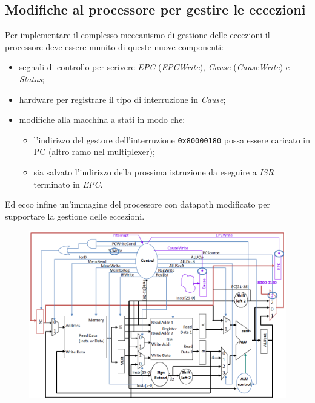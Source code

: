 \documentclass[class=book, crop=false, oneside]{standalone}
\begin{document}
\subsection{Modifiche al processore per gestire le eccezioni}
Per implementare il complesso meccanismo di gestione delle eccezioni il processore deve essere munito di queste nuove componenti:
\begin{itemize}
	\item segnali di controllo per scrivere \emph{EPC} (\emph{EPCWrite}), \emph{Cause} (\emph{CauseWrite}) e \emph{Status};
	\item hardware per registrare il tipo di interruzione in \emph{Cause};
	\item modifiche alla macchina a stati in modo che:
	\begin{itemize}
		\item l'indirizzo del gestore dell'interruzione \texttt{0x80000180} possa essere caricato in PC (altro ramo nel multiplexer);
		\item sia salvato l'indirizzo della prossima istruzione da eseguire a \emph{ISR} terminato in \emph{EPC}.
	\end{itemize}
\end{itemize}
Ed ecco infine un'immagine del processore con datapath modificato per supportare la gestione delle eccezioni.
\begin{figure}[H]
	\centering
	\includegraphics[width=\textwidth,keepaspectratio]{final-datapath}
\end{figure}
\end{document}
